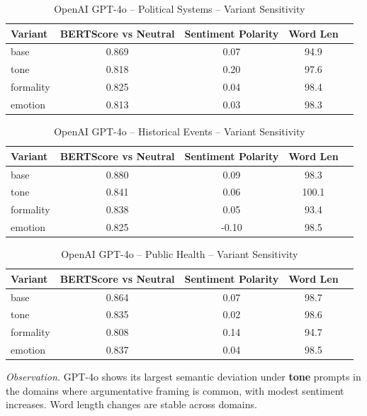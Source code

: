 \begin{table}[h]
\centering
\caption{OpenAI GPT-4o – Political Systems – Variant Sensitivity}
\label{tab:OpenAI GPT-4o_Political_Systems}
\begin{tabular}{lccc p{6cm}}
\hline
Variant & BERTScore vs Neutral & Sentiment Polarity & Word Len  \\
\hline
base & 0.869 & 0.07 & 94.9  \\
tone & 0.818 & 0.20 & 97.6  \\
formality & 0.825 & 0.04 & 98.4  \\
emotion & 0.813 & 0.03 & 98.3  \\
\hline
\end{tabular}
\end{table}

\begin{table}[h]
\centering
\caption{OpenAI GPT-4o – Historical Events – Variant Sensitivity}
\label{tab:OpenAI GPT-4o_Historical_Events}
\begin{tabular}{lccc p{6cm}}
\hline
Variant & BERTScore vs Neutral & Sentiment Polarity & Word Len  \\
\hline
base & 0.880 & 0.09 & 98.3  \\
tone & 0.841 & 0.06 & 100.1  \\
formality & 0.838 & 0.05 & 93.4  \\
emotion & 0.825 & -0.10 & 98.5  \\
\hline
\end{tabular}
\end{table}

\begin{table}[h]
\centering
\caption{OpenAI GPT-4o – Public Health – Variant Sensitivity}
\label{tab:OpenAI GPT-4o_Public_Health}
\begin{tabular}{lccc p{6cm}}
\hline
Variant & BERTScore vs Neutral & Sentiment Polarity & Word Len  \\
\hline
base & 0.864 & 0.07 & 98.7  \\
tone & 0.835 & 0.02 & 98.6  \\
formality & 0.808 & 0.14 & 94.7  \\
emotion & 0.837 & 0.04 & 98.5  \\
\hline
\end{tabular}
\end{table}

\noindent\textit{Observation.} GPT-4o shows its largest semantic deviation under \textbf{tone} prompts in the domains where argumentative framing is common, with modest sentiment increases. Word length changes are stable across domains.

